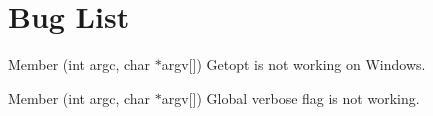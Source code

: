 \chapter{Bug List}
\hypertarget{bug}{}\label{bug}

\begin{DoxyRefList}
\item[Member \doxylink{main_8cpp_a2b2d4ce8b34d14b9e775eaf6214b00e1}{main} (int argc, char \texorpdfstring{$\ast$}{*}argv\mbox{[}\mbox{]})]\label{bug__bug000002}%
%
Getopt is not working on Windows.  
\item[Member \doxylink{classutils_1_1StartupHandler_a9cdd57841cee245c1a1c94b0efe6549c}{utils\+::Startup\+Handler\+::get\+Options} (int argc, char \texorpdfstring{$\ast$}{*}argv\mbox{[}\mbox{]})]\label{bug__bug000001}%
%
 Global verbose flag is not working.
\end{DoxyRefList}